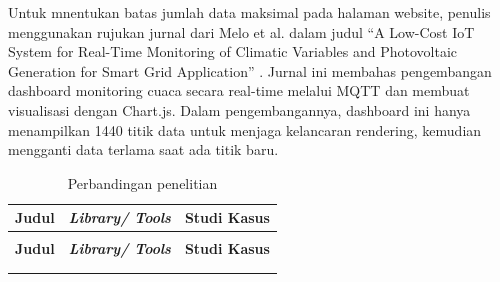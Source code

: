 Untuk mnentukan batas jumlah data maksimal pada halaman website, penulis menggunakan rujukan jurnal dari Melo et al. dalam judul “A Low-Cost IoT System for Real-Time Monitoring of Climatic Variables and Photovoltaic Generation for Smart Grid Application” \cite{Melo2021}. Jurnal ini membahas pengembangan dashboard monitoring cuaca secara real-time melalui MQTT dan membuat visualisasi dengan Chart.js. Dalam pengembangannya, dashboard ini hanya menampilkan 1440 titik data untuk menjaga kelancaran rendering, kemudian mengganti data terlama saat ada titik baru. 

\begin{longtable}{|p{}|
		p{}|
		p{}|}
	\caption{Perbandingan penelitian} \label{t_risetPemodelan} \\
	\hline
	\textbf{Judul} & \textbf{\textit{Library/ Tools }} & \textbf{Studi Kasus} \\ \hline
	\endfirsthead
	
	\multicolumn{3}{c}{} \\ \hline
	\textbf{Judul} & \textbf{\textit{Library/ Tools }} & \textbf{Studi Kasus} \\ \hline
	\endhead
	
	\hline \multicolumn{3}{r}{ } \\ 
	\endfoot
	
	\hline
	\endlastfoot
	

\end{longtable}
